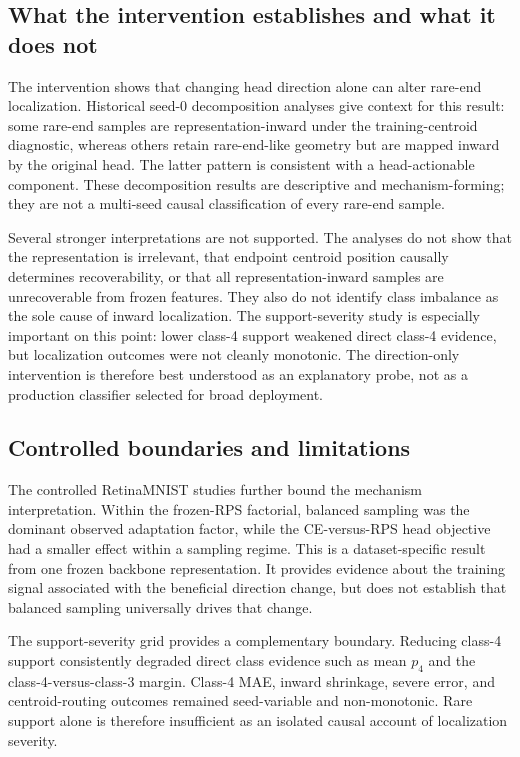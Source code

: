 \subsection{What the intervention establishes and what it does not}

The intervention shows that changing head direction alone can alter rare-end
localization. Historical seed-0 decomposition analyses give context for this
result: some rare-end samples are representation-inward under the
training-centroid diagnostic, whereas others retain rare-end-like geometry but
are mapped inward by the original head. The latter pattern is consistent with a
head-actionable component. These decomposition results are descriptive and
mechanism-forming; they are not a multi-seed causal classification of every
rare-end sample.

Several stronger interpretations are not supported. The analyses do not show
that the representation is irrelevant, that endpoint centroid position
causally determines recoverability, or that all representation-inward samples
are unrecoverable from frozen features. They also do not identify class
imbalance as the sole cause of inward localization. The support-severity study
is especially important on this point: lower class-4 support weakened direct
class-4 evidence, but localization outcomes were not cleanly monotonic. The
direction-only intervention is therefore best understood as an explanatory
probe, not as a production classifier selected for broad deployment.

\subsection{Controlled boundaries and limitations}

The controlled RetinaMNIST studies further bound the mechanism interpretation.
Within the frozen-RPS factorial, balanced sampling was the dominant observed
adaptation factor, while the CE-versus-RPS head objective had a smaller effect
within a sampling regime. This is a dataset-specific result from one frozen
backbone representation. It provides evidence about the training signal
associated with the beneficial direction change, but does not establish that
balanced sampling universally drives that change.

The support-severity grid provides a complementary boundary. Reducing class-4
support consistently degraded direct class evidence such as mean $p_4$ and the
class-4-versus-class-3 margin. Class-4 MAE, inward shrinkage, severe error, and
centroid-routing outcomes remained seed-variable and non-monotonic. Rare
support alone is therefore insufficient as an isolated causal account of
localization severity.

